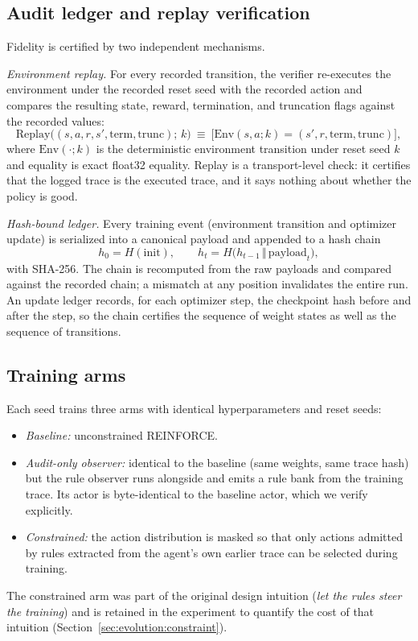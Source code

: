 \documentclass[11pt]{article}
\begin{document}
\subsection{Audit ledger and replay verification}
\label{sec:method:ledger}

Fidelity is certified by two independent mechanisms.

\emph{Environment replay.} For every recorded transition, the verifier re-executes the environment
under the recorded reset seed with the recorded action and compares the resulting state, reward,
termination, and truncation flags against the recorded values:
\begin{equation}
\mathrm{Replay}\big((s,a,r,s',\mathrm{term},\mathrm{trunc});\,k\big)\ \equiv\ \big[\mathrm{Env}(s,a;k) = (s',r,\mathrm{term},\mathrm{trunc})\big],
\label{eq:replay}
\end{equation}
where $\mathrm{Env}(\cdot;k)$ is the deterministic environment transition under reset seed $k$ and
equality is exact float32 equality. Replay is a transport-level check: it certifies that the logged
trace is the executed trace, and it says nothing about whether the policy is good.

\emph{Hash-bound ledger.} Every training event (environment transition and optimizer update) is
serialized into a canonical payload and appended to a hash chain
\begin{equation}
h_0 = H(\mathrm{init}), \qquad h_{t} = H\big(h_{t-1} \,\Vert\, \mathrm{payload}_t\big),
\label{eq:hashchain}
\end{equation}
with SHA-256. The chain is recomputed from the raw payloads and compared against the recorded chain;
a mismatch at any position invalidates the entire run. An update ledger records, for each optimizer
step, the checkpoint hash before and after the step, so the chain certifies the sequence of weight
states as well as the sequence of transitions.

\subsection{Training arms}
\label{sec:method:arms}

Each seed trains three arms with identical hyperparameters and reset seeds:
\begin{itemize}
  \item \emph{Baseline:} unconstrained REINFORCE.
  \item \emph{Audit-only observer:} identical to the baseline (same weights, same trace hash) but the
        rule observer runs alongside and emits a rule bank from the training trace. Its actor is
        byte-identical to the baseline actor, which we verify explicitly.
  \item \emph{Constrained:} the action distribution is masked so that only actions admitted by rules
        extracted from the agent's own earlier trace can be selected during training.
\end{itemize}
The constrained arm was part of the original design intuition (\emph{let the rules steer the
training}) and is retained in the experiment to quantify the cost of that intuition
(Section~\ref{sec:evolution:constraint}).
\end{document}
